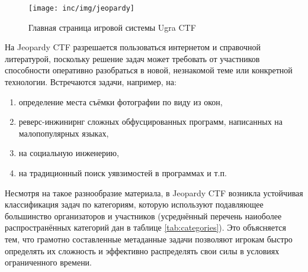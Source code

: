 
\begin{figure}
  \centering
  \texttt{[image: inc/img/jeopardy]}
  \caption{Главная страница игровой системы Ugra CTF}
  \label{fig:jeopardy}
\end{figure}

На Jeopardy CTF разрешается пользоваться интернетом и справочной литературой, поскольку решение задач может требовать от участников способности оперативно разобраться в новой, незнакомой теме или конкретной технологии. Встречаются задачи, например, на:
\begin{enumerate}
\item определение места съёмки фотографии по виду из окон\cite{BigcitylightsTask},
\item реверс-инжинирнг сложных обфусцированных программ, написанных на малопопулярных языках\cite{ReverseTask},
\item на социальную инженерию\cite{SocialTask},
\item на традиционный поиск уявзимостей в программах\cite{WebTask} и т.п.
\end{enumerate}

Несмотря на такое разнообразие материала, в Jeopardy CTF возникла устойчивая классификация задач по категориям, которую используют подавляющее большинство организаторов и участников (усреднённый перечень наиоболее распространённых категорий дан в таблице \ref{tab:categories}). Это объясняется тем, что грамотно составленные метаданные задачи позволяют игрокам быстро определять их сложность и эффективно распределять свои силы в условиях ограниченного времени.

